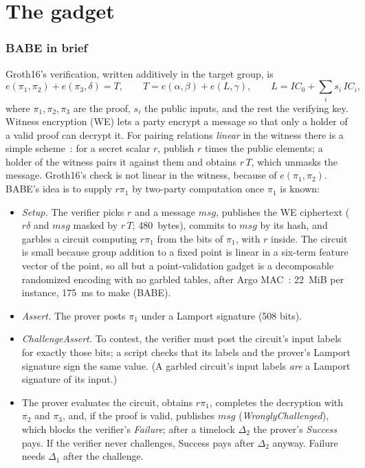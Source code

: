 \documentclass[11pt]{article}
\begin{document}
\part{The gadget}

\section{BABE in brief}
\label{sec:babe}

Groth16's verification, written additively in the target group, is
\[
  e(\pi_1, \pi_2) + e(\pi_3, \delta) = T, \qquad
  T = e(\alpha, \beta) + e(L, \gamma), \qquad
  L = \mathit{IC}_0 + \textstyle\sum_i s_i\, \mathit{IC}_i,
\]
where $\pi_1, \pi_2, \pi_3$ are the proof, $s_i$ the public inputs, and
the rest the verifying key. Witness encryption (WE) lets a party encrypt
a message so that only a holder of a valid proof can decrypt it. For
pairing relations \emph{linear} in the witness there is a simple
scheme~\cite{gkpw24}: for a secret scalar $r$, publish $r$ times the
public elements; a holder of the witness pairs it against them and
obtains $r\,T$, which unmasks the message. Groth16's check is not linear
in the witness, because of $e(\pi_1, \pi_2)$. BABE's idea is to supply
$r\pi_1$ by two-party computation once $\pi_1$ is known:
\begin{itemize}[leftmargin=1.5em]
\item \emph{Setup.} The verifier picks $r$ and a message $\mathit{msg}$,
  publishes the WE ciphertext ($r\delta$ and $\mathit{msg}$ masked by
  $r\,T$; 480~bytes), commits to $\mathit{msg}$ by its hash, and
  garbles a circuit computing $r\pi_1$ from the bits of $\pi_1$, with $r$
  inside. The circuit is small because group addition to a fixed point
  is linear in a six-term feature vector of the point, so all but a
  point-validation gadget is a decomposable randomized encoding with no
  garbled tables, after Argo MAC~\cite{argo}: 22~MiB per instance, 175~ms
  to make (BABE).
\item \emph{Assert.} The prover posts $\pi_1$ under a Lamport signature
  (508 bits).
\item \emph{ChallengeAssert.} To contest, the verifier must post the
  circuit's input labels for exactly those bits; a script checks that
  its labels and the prover's Lamport signature sign the same value. (A
  garbled circuit's input labels \emph{are} a Lamport signature of its
  input.)
\item The prover evaluates the circuit, obtains $r\pi_1$, completes the
  decryption with $\pi_2$ and $\pi_3$, and, if the proof is valid,
  publishes $\mathit{msg}$ (\emph{WronglyChallenged}), which blocks the
  verifier's \emph{Failure}; after a timelock $\Delta_2$ the prover's
  \emph{Success} pays. If the verifier never challenges, Success pays
  after $\Delta_2$ anyway. Failure needs $\Delta_1$ after the challenge.
\end{itemize}
\end{document}
